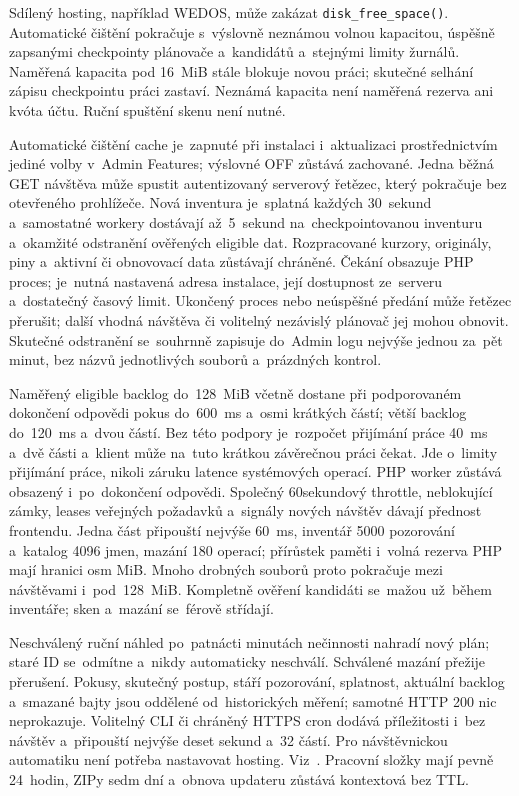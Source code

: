 \documentclass[11pt,a4paper]{article}
\newcommand{\filepath}[1]{\path{#1}}
\newcommand{\codeword}[1]{\nolinkurl{#1}}
\begin{document}
Sdílený hosting, například WEDOS, může zakázat \codeword{disk_free_space()}.
Automatické čištění pokračuje s~výslovně neznámou volnou kapacitou, úspěšně
zapsanými checkpointy plánovače a~kandidátů a~stejnými limity žurnálů. Naměřená
kapacita pod 16~MiB stále blokuje novou práci; skutečné selhání zápisu
checkpointu práci zastaví. Neznámá kapacita není naměřená rezerva ani kvóta
účtu. Ruční spuštění skenu není nutné.

Automatické čištění cache je~zapnuté při instalaci i~aktualizaci prostřednictvím
jediné volby v~Admin Features; výslovné OFF zůstává zachované. Jedna běžná GET
návštěva může spustit autentizovaný serverový řetězec, který pokračuje bez
otevřeného prohlížeče. Nová inventura je~splatná každých 30~sekund a~samostatné
workery dostávají až~5~sekund na~checkpointovanou inventuru a~okamžité
odstranění ověřených eligible dat. Rozpracované kurzory, originály, piny
a~aktivní či obnovovací data zůstávají chráněné. Čekání obsazuje PHP proces;
je~nutná nastavená adresa instalace, její dostupnost ze~serveru a~dostatečný
časový limit. Ukončený proces nebo neúspěšné předání může řetězec přerušit;
další vhodná návštěva či volitelný nezávislý plánovač jej mohou obnovit.
Skutečné odstranění se~souhrnně zapisuje do~Admin logu nejvýše jednou za~pět
minut, bez názvů jednotlivých souborů a~prázdných kontrol.

Naměřený eligible backlog do~128~MiB včetně dostane při podporovaném dokončení
odpovědi pokus do~600~ms a~osmi krátkých částí; větší backlog do~120~ms a~dvou
částí. Bez této podpory je~rozpočet přijímání práce 40~ms a~dvě části a~klient
může na~tuto krátkou závěrečnou práci čekat. Jde o~limity přijímání práce,
nikoli záruku latence systémových operací. PHP worker zůstává obsazený
i~po~dokončení odpovědi. Společný 60sekundový throttle, neblokující zámky,
leases veřejných požadavků a~signály nových návštěv dávají přednost frontendu.
Jedna část připouští nejvýše 60~ms, inventář 5000 pozorování a~katalog 4096
jmen, mazání 180 operací; přírůstek paměti i~volná rezerva PHP mají hranici osm
MiB. Mnoho drobných souborů proto pokračuje mezi návštěvami i~pod~128~MiB.
Kompletně ověření kandidáti se~mažou už~během inventáře; sken a~mazání se~férově
střídají.

Neschválený ruční náhled po~patnácti minutách nečinnosti nahradí nový plán;
staré ID se~odmítne a~nikdy automaticky neschválí. Schválené mazání přežije
přerušení. Pokusy, skutečný postup, stáří pozorování, splatnost, aktuální
backlog a~smazané bajty jsou oddělené od~historických měření; samotné HTTP 200
nic neprokazuje. Volitelný CLI či chráněný HTTPS cron dodává příležitosti i~bez
návštěv a~připouští nejvýše deset sekund a~32 částí. Pro návštěvnickou
automatiku není potřeba nastavovat hosting.
Viz~\filepath{docs/CACHE_MAINTENANCE.md}. Pracovní složky mají pevně 24~hodin,
ZIPy sedm dní a~obnova updateru zůstává kontextová bez TTL.
\end{document}
